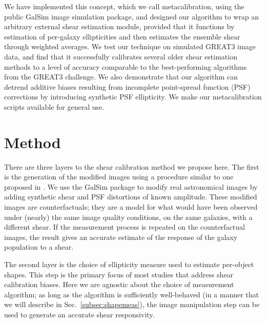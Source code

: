 \documentclass[iop]{emulateapj}
\newcommand\rmcomment[1]{\textcolor{red}{(RM: #1)}}
\begin{document}

We have implemented this concept, which we call metacalibration, using
the public GalSim \citep{2015A&C....10..121R} image simulation
package, and designed our algorithm to wrap an arbitrary external
shear estimation module, provided that it functions by estimation of per-galaxy ellipticities and
then estimates the ensemble shear through weighted averages. We test our technique on simulated GREAT3
image data, and find that it successfully calibrates several older shear
estimation methods to a level of accuracy comparable to the
best-performing algorithms from the GREAT3 challenge. We also
demonstrate that our algorithm can detrend additive biases resulting
from incomplete point-spread function (PSF) corrections by introducing synthetic PSF
ellipticity.  We make our metacalibration scripts available for
general use.

\section{Method}
There are three layers to the shear calibration method we propose
here. The first is the generation of the modified images using a procedure similar to one proposed
in \cite{2000ApJ...537..555K}.
We use the GalSim package \citep{2015A&C....10..121R} to modify real
astronomical images by adding synthetic shear and PSF distortions of
known amplitude. These modified images are counterfactuals; they are a
model for what would have been observed under (nearly) the same image
quality conditions, on the same galaxies, with a different shear. If
the measurement process is repeated on the counterfactual images, the
result gives an accurate estimate of the response of the galaxy population to a shear.

The second layer is the choice of ellipticity measure used to estimate
per-object shapes. This step is the primary focus of most studies that
address shear calibration biases. Here we are agnostic about the
choice of measurement algorithm; as long as the algorithm is
sufficiently well-behaved (in a manner that we will describe in
Sec.~\ref{subsec:shapemeas}), the image manipulation step can be used
to generate an accurate shear responsivity.
\end{document}
